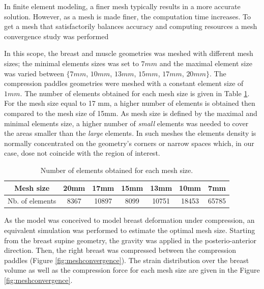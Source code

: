 In finite element modeling, a finer mesh typically results in a more accurate solution. However, as a mesh is made finer, the computation time increases. To get a mesh that satisfactorily balances accuracy and computing resources a mesh convergence study was performed

In this scope, the breast and muscle geometries was meshed with different mesh sizes; the minimal elements sizes was set to $7mm$ and the maximal element size was varied between $\lbrace 7mm$,  $10 mm$, $13mm$, $15mm$, $17mm$, $20mm\rbrace$. The compression paddles geometries were meshed with a constant element size of $1mm$. The number of elements obtained for each mesh size is given in Table  \ref{nbElementsvsmeshsize}. For the mesh size equal to 17 mm, a higher number of elements is obtained then compared to the  mesh size of 15mm. As  mesh size is defined by the maximal and minimal elements size, a higher number of \textit{small} elements was needed to cover the areas smaller than the \textit{large} elements. In such meshes the elements density is normally concentrated on the geometry's corners or narrow spaces which, in our case, dose not coincide with the region of interest.  

\begin{table}[!h]
\begin{tabular}{|c|c|c|c|c|c|c|}
\hline
Mesh size & 20mm & 17mm & 15mm & 13mm & 10mm & 7mm \\
\hline
Nb. of elements & 8367 & 10897 & 8099 & 10751 & 18453 & 65785 \\
\hline
\end{tabular}
\caption{Number of elements obtained for each mesh size.}
\label{nbElementsvsmeshsize}
\end{table} 

As the model was conceived to model breast deformation under compression, an equivalent simulation was performed to estimate the optimal mesh size. Starting from the breast supine geometry, the gravity was applied in the posterio-anterior direction. Then, the right breast was compressed between the compression paddles (Figure \ref{fig:meshconvergence}). The strain distribution over the breast volume as well as the compression force for each mesh size are given in the Figure \ref{fig:meshconvergence}. 

